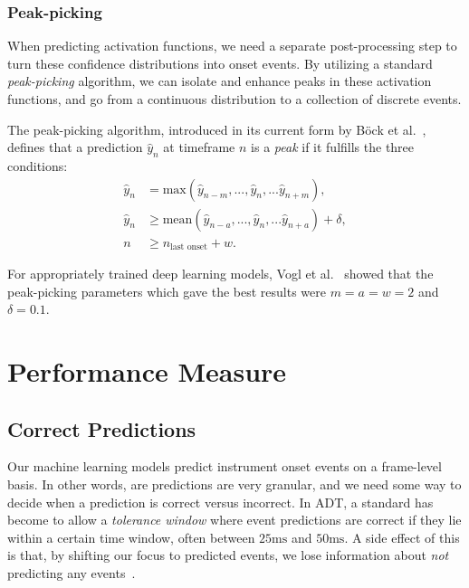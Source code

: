 \subsubsection{Peak-picking}

When predicting activation functions, we need a separate post-processing step to turn these confidence distributions into onset events. By utilizing a standard \textit{peak-picking} algorithm, we can isolate and enhance peaks in these activation functions, and go from a continuous distribution to a collection of discrete events.

The peak-picking algorithm, introduced in its current form by Böck et al.~\cite{Bck2012EvaluatingTO}, defines that a prediction $\hat{y}_n$ at timeframe $n$ is a \textit{peak} if it fulfills the three conditions:
\begin{align*} 
    \hat{y}_n &= \text{max}(\hat{y}_{n - m}, ..., \hat{y}_n, ... \hat{y}_{n + m}), \\ 
    \hat{y}_n &\ge \text{mean}(\hat{y}_{n - a}, ..., \hat{y}_n, ... \hat{y}_{n + a}) + \delta, \\
    n &\ge n_\text{last onset} + w.
\end{align*}

For appropriately trained deep learning models, Vogl et al.~\cite{vogl2018multiinstrumentdrumtranscription} showed that the peak-picking parameters which gave the best results were $m = a = w = 2$ and $\delta = 0.1$.

\section{Performance Measure}

\subsection{Correct Predictions}

Our machine learning models predict instrument onset events on a frame-level basis. In other words, are predictions are very granular, and we need some way to decide when a prediction is correct versus incorrect. In \gls{ADT}, a standard has become to allow a \textit{tolerance window} where event predictions are correct if they lie within a certain time window, often between $25\text{ms}$ and $50\text{ms}$. A side effect of this is that, by shifting our focus to predicted events, we lose information about \textit{not} predicting any events~\cite{vogl2016recurrent}.

